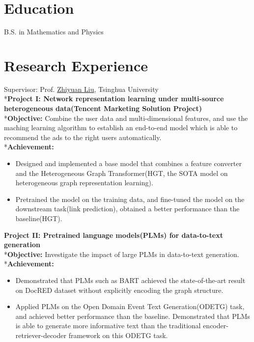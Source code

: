 \documentclass{resume}
\begin{document}



\section{Education}
B.S. in Mathematics and Physics


\section{Research Experience}
Supervisor: Prof. \href{http://nlp.csai.tsinghua.edu.cn/~lzy/}{Zhiyuan Liu}, Tsinghua University
\\*\textbf{Project I: Network representation learning under multi-source heterogeneous data(Tencent Marketing Solution Project)}
\\*\textbf{Objective:} Combine the user data and multi-dimensional features, and use the maching learning algorithm to establish an end-to-end model which is able to recommend the ads to the right users automatically. 
\\*\textbf{Achievement:}
\begin{itemize}
  \item Designed and implemented a base model that combines a feature converter and the Heterogeneous Graph Transformer(HGT, the SOTA model on heterogeneous graph representation learning). 
  \item Pretrained the model on the training data, and fine-tuned the model on the downstream task(link prediction), obtained a better performance than the baseline(HGT).
\end{itemize}

\textbf{Project II: Pretrained language models(PLMs) for data-to-text generation}
\\*\textbf{Objective:} Investigate the impact of large PLMs in data-to-text generation.
\\*\textbf{Achievement:}
\begin{itemize}
  \item Demonstrated that PLMs such as BART achieved the state-of-the-art result on DocRED dataset without explicitly encoding the graph structure.
  \item Applied PLMs on the Open Domain Event Text Generation(ODETG) task, and achieved better performance than the baseline. Demonstrated that PLMs is able to generate more informative text than the traditional encoder-retriever-decoder framework on this ODETG task.
\end{itemize}
\end{document}
